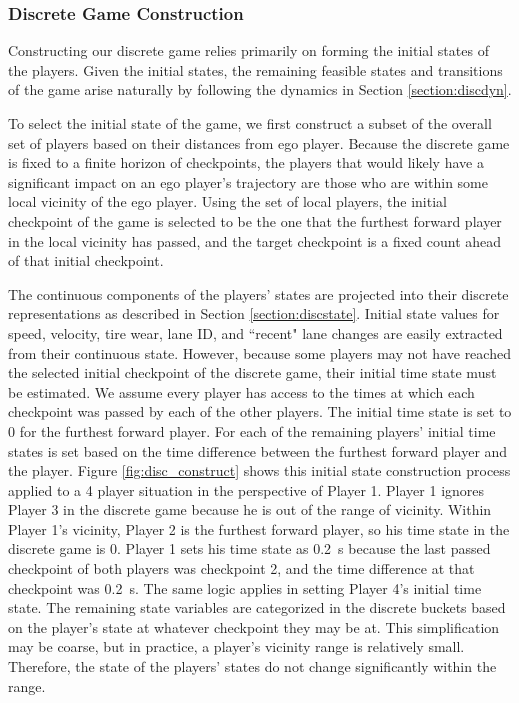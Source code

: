 \subsubsection{Discrete Game Construction}
Constructing our discrete game relies primarily on forming the initial states of the players. Given the initial states, the remaining feasible states and transitions of the game arise naturally by following the dynamics in Section \ref{section:discdyn}. 

To select the initial state of the game, we first construct a subset of the overall set of players based on their distances from ego player. Because the discrete game is fixed to a finite horizon of checkpoints, the players that would likely have a significant impact on an ego player's trajectory are those who are within some local vicinity of the ego player. Using the set of local players, the initial checkpoint of the game is selected to be the one that the furthest forward player in the local vicinity has passed, and the target checkpoint is a fixed count ahead of that initial checkpoint. 

The continuous components of the players' states are projected into their discrete representations as described in Section \ref{section:discstate}. Initial state values for speed, velocity, tire wear, lane ID, and ``recent" lane changes are easily extracted from their continuous state. However, because some players may not have reached the selected initial checkpoint of the discrete game, their initial time state must be estimated. We assume every player has access to the times at which each checkpoint was passed by each of the other players. The initial time state is set to 0 for the furthest forward player. For each of the remaining players' initial time states is set based on the time difference between the furthest forward player and the player. Figure \ref{fig:disc_construct} shows this initial state construction process applied to a 4 player situation in the perspective of Player 1. Player 1 ignores Player 3 in the discrete game because he is out of the range of vicinity. Within Player 1's vicinity, Player 2 is the furthest forward player, so his time state in the discrete game is 0. Player 1 sets his time state as \SI{0.2}{\second} because the last passed checkpoint of both players was checkpoint 2, and the time difference at that checkpoint was \SI{0.2}{\second}. The same logic applies in setting Player 4's initial time state. The remaining state variables are categorized in the discrete buckets based on the player's state at whatever checkpoint they may be at. This simplification may be coarse, but in practice, a player's vicinity range is relatively small. Therefore, the state of the players' states do not change significantly within the range.

